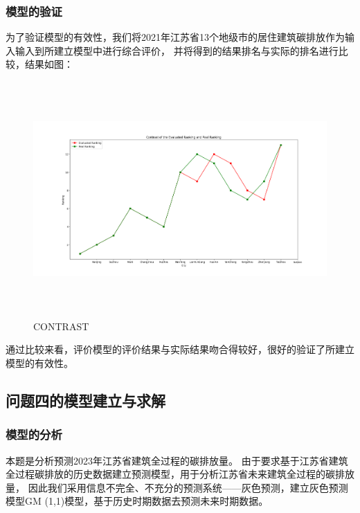 \documentclass[a4paper, 12pt]{article}
\numberwithin{equation}{section}
\begin{document}
                \subsubsection{模型的验证}
                    为了验证模型的有效性，我们将2021年江苏省13个地级市的居住建筑碳排放作为输入输入到所建立模型中进行综合评价，
                    并将得到的结果排名与实际的排名进行比较，结果如图：
                    \newpage
                    \begin{figure}[h]
                        \centering
                        \includegraphics[height=9cm,width=15cm]{contrast_q3.png}
                        \caption{CONTRAST}
                    \end{figure}
                    通过比较来看，评价模型的评价结果与实际结果吻合得较好，很好的验证了所建立模型的有效性。


            \subsection{问题四的模型建立与求解}
                \subsubsection{模型的分析}
                    本题是分析预测2023年江苏省建筑全过程的碳排放量。
                    由于要求基于江苏省建筑全过程碳排放的历史数据建立预测模型，用于分析江苏省未来建筑全过程的碳排放量，
                    因此我们采用信息不完全、不充分的预测系统——灰色预测，建立灰色预测模型GM (1,1)模型，基于历史时期数据去预测未来时期数据。
\end{document}
